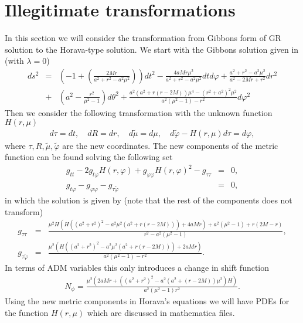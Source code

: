 \documentclass[preprint,aps,tightenlines,showkeys,nofootinbib,superscriptaddress]{revtex4}
\begin{document}
\section{Illegitimate transformations}
In this section we will consider the transformation from Gibbons form
of GR solution to the Horava-type solution. We start with the Gibbons
solution given in \cite{Gibb:2004} (with $\lambda = 0$)
\begin{eqnarray}
  ds^{2} &= & \left(  -1+\left(\frac{2Mr}{a^{2}+r^{2}-a^{2}\mu ^{2}
  }\right)\right)dt^2
  -\frac{4aMr \mu^{2}}{a^{2}+r^{2}-a^2 \mu^2   }dt d
  \varphi+\frac{a^{2}+r^{2}-a^{2}\mu ^{2}    }{a^{2}-2Mr+r^{2}  }dr^2
  \nonumber\\
  & +& \left(a^{2} - \frac{r^{2}}{\mu ^{2}-1 } \right)d \theta ^{2}
  +\frac{a^2(a^2+r(r-2M))\mu ^{4}-(r^2+a^2)^2 \mu ^2}{a^2(\mu
  ^2-1)-r^2 }d \varphi ^2
\end{eqnarray}
Then we consider the following transformation with the unknown
function $H(r,\mu )$
\begin{eqnarray}
  d \tau  = dt,\quad dR=dr,\quad d \tilde \mu  = d \mu, \quad d
  \tilde \varphi -H(r,\mu )d \tau = d \varphi,
\end{eqnarray}
where $\tau ,R,\tilde \mu , \tilde \varphi $ are the new coordinates.
The new components of the metric
function can be found solving the following set
\begin{eqnarray}
  g_{t t}-2g_{t \varphi }H(r,\varphi )+g_{\varphi \varphi
  }H(r,\varphi )^{2}-g_{\tau \tau }&=&0,\\
  g_{t \varphi }-g_{\varphi  \varphi }-g_{\tau \tilde \varphi }&=&0,
\end{eqnarray}
in which the solution is given by (note that the rest of the
components does not transform)
\begin{eqnarray}
  g_{\tau \tau} &=& \frac{{\mu }^2 H \left(H
      \left(\left(a^2+r^2\right)^2-a^2 {\mu }^2 \left(a^2+r (r-2
    M)\right)\right)+4 a M r\right)+a^2 \left({\mu }^2-1\right)+r (2
  M-r)}{r^2-a^2 \left({\mu }^2-1\right)},\\
  g_{\tau \tilde\varphi} &=&\frac{\mu ^2 \left(H
      \left(\left(a^2+r^2\right)^2-a^2 \mu ^2 \left(a^2+r (r-2
  M)\right)\right)+2 a M r\right)}{a^2 \left(\mu ^2-1\right)-r^2}.
\end{eqnarray}
In terms of ADM variables this only introduces a change in shift function
\begin{eqnarray}
  N_{\phi} = \frac{\mu ^{2}(2aMr+((a^{2}+r^2 )^{2}-a^{2}(a^{2}+(r-2M)
  )\mu ^{2}   )H) }{a^{2}(\mu^{2}-1 ) r^{2} }.
\end{eqnarray}
Using the new metric components in Horava's equations we will have
PDEs for the function $H(r,\mu )$ which are discussed in mathematica files.
\end{document}
